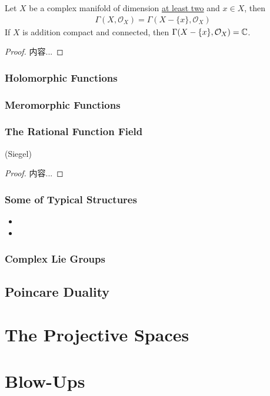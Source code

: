 \documentclass[Total.tex]{subfiles}
\begin{document}
					\begin{corollary}
						Let $X$ be a complex manifold of dimension \underline{at least two} and $x\in X$, then
						\begin{gather*}
							\Gamma(X,\mathcal{O}_X)=\Gamma(X-\{x\},\mathcal{O}_X)
						\end{gather*}
						If $X$ is addition compact and connected, then $\Gamma(X-\{x\},\mathcal{O}_X)=\mathbb{C}$.
					\end{corollary}
					\begin{proof}
						内容...
					\end{proof}
				\subsubsection{Holomorphic Functions}
				\subsubsection{Meromorphic Functions}
				\subsubsection{The Rational Function Field}
					\begin{proposition}
						(Siegel)
					\end{proposition}
					\begin{proof}
						内容...
					\end{proof}
				\subsubsection{Some of Typical Structures}
					\begin{itemize}
						\item 
						\item 
					\end{itemize}
				\subsubsection{Complex Lie Groups}
			\subsection{Poincare Duality}
		\section{The Projective Spaces}	
		\section{Blow-Ups}
\end{document}
